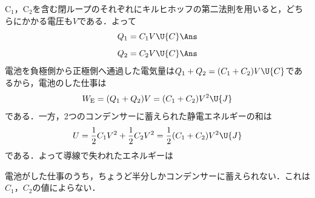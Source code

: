 \begin{reidaiunit}
\begin{kaitou}
\begin{komon}
 $\mathrm{C}_1$，$\mathrm{C}_2$を含む閉ループのそれぞれにキルヒホッフの第二法則を用いると，どちらにかかる電圧も$V$である．よって
       \[Q_1=C_1V\U{C}\Ans\]
       \[Q_2=C_2V\U{C}\Ans\]
 電池を負極側から正極側へ通過した電気量は$Q_1+Q_2=(C_1+C_2)V\U{C}$であるから，電池のした仕事は
       \[W_{\mathrm{E}}=(Q_1+Q_2)V=(C_1+C_2)V^2\U{J}\]
       である．一方，2つのコンデンサーに蓄えられた静電エネルギーの和は
       \[U=\frac{1}{2}C_1V^2+\frac{1}{2}C_2V^2=\frac{1}{2}(C_1+C_2)V^2\U{J}\]
       である．よって導線で失われたエネルギーは
       \begin{chuu}
       電池がした仕事のうち，{\gtfamily ちょうど半分}しかコンデンサーに蓄えられない．これは$C_1$，$C_2$の値によらない．
       \end{chuu}
\end{komon}
\end{kaitou}
\end{reidaiunit}

